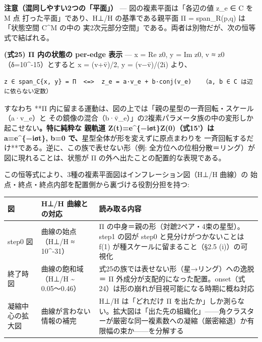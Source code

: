 \documentclass[
  a4paper,
]{ltjsarticle}
\newcounter{none} %
\begin{document}
\textbf{注意（混同しやすい2つの「平面」）} --- 図の複素平面は「各辺の値
z\_e ∈ C を M 点 打った平面」であり、H⊥/H の基準である親平面 Π =
span\_R(p,q) は「状態空間 C\^{}M の中の
実2次元部分空間」である。両者は別物だが、次の恒等式で結ばれる。

\textbf{(式25) Π 内の状態の per-edge 表示} --- x = Re z0, y = Im z0, v ≈
z0（δ=10\^{}-15）とすると x = (v+v̄)/2, y = (v−v̄)/(2i) より、

\begin{verbatim}
z ∈ span_C{x, y} = Π  <=>  z_e = a·v_e + b·conj(v_e)   （a, b ∈ C は辺に依らない定数）
\end{verbatim}

すなわち **Π
内に留まる運動は、図の上では「親の星型の一斉回転・スケール（a·v\_e）と
その鏡像の混合（b·v̄\_e）」の2複素パラメータ族の中の変形しか起こせない\textbf{。特に純粋な
親軌道 Z(t)=e\^{}\{−iσt\}Z(0)（式15'）は a=e\^{}\{−iσt\}, b=0
で、}星型全体が形を変えずに原点まわりを
一斉回転するだけ**である。逆に、この族で表せない形（例:
全方位への位相分散＝リング）が 図に現れることは、状態が Π
の外へ出たことの配置的な表現である。

この恒等式により、3種の複素平面図はインフレーション図（H⊥/H 曲線）の
始点・終点・終点内部を配置側から裏づける役割分担を持つ:

{\def\LTcaptype{none} %
\begin{longtable}[]{@{}
  >{\raggedright\arraybackslash}p{}
  >{\raggedright\arraybackslash}p{}
  >{\raggedright\arraybackslash}p{}@{}}
\toprule\noalign{}
\begin{minipage}[b]{\linewidth}\raggedright
図
\end{minipage} & \begin{minipage}[b]{\linewidth}\raggedright
H⊥/H 曲線との対応
\end{minipage} & \begin{minipage}[b]{\linewidth}\raggedright
読み取る内容
\end{minipage} \\
\midrule\noalign{}
\endhead
\bottomrule\noalign{}
\endlastfoot
step0 図 & 曲線の始点（H⊥/H ≈ 10\^{}-31） & Π
の中身＝親の形（対蹠2ペア・4束の星型）。step1 の図が step0
と見分けがつかないことは f(1) が種スケールに留まること（§2.5
(i)）の可視化 \\
終了時図 & 曲線の飽和域（H⊥/H \textasciitilde{} 0.05〜0.46） &
式25の族では表せない形（星→リング）への逸脱＝ Π
外成分が支配的になった配置。onset（式24）は形の崩れが目視可能になる時期に概ね対応 \\
凝縮中心の拡大図 & 曲線が言わない情報の補完 & H⊥/H は「どれだけ Π
を出たか」しか測らない。拡大図は「出た先の組織化」------角クラスターが厳密な同一複素数への凝縮（厳密縮退）か有限幅の束か------を分解する \\
\end{longtable}
}
\end{document}
